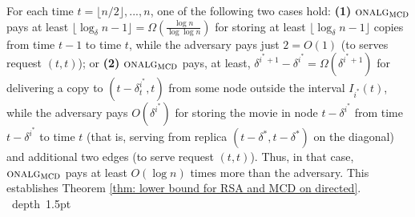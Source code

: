 \documentclass[11pt]{article}
\def\blackslug{\hbox{\hskip 1pt \vrule width 4pt height 8pt
    depth 1.5pt \hskip 1pt}}
\def\QED{\quad\blackslug\lower 8.5pt\null\par}
\newcommand{\onalgrsa}[0]{\mbox{\sc onalg}_{\mbox{\sc\small mcd}}}
\begin{document}
For each time $t= \lfloor n/2\rfloor,...,n$,
one of the following two cases hold:
{\bf (1)}
$\onalgrsa$ pays at least $\lfloor\log_\delta n-1\rfloor=\Omega(\frac{\log n}{\log \log n})$ for storing at least $\lfloor\log_\delta n-1\rfloor$ copies from time $t-1$ to time $t$,
while the adversary pays just $2=O(1)$ (to serves request $(t,t)$); or
{\bf (2)} $\onalgrsa$ pays, at least, $\delta^{i^*+1}-\delta^{i^*}=\Omega(\delta^{i^*+1})$ for delivering a copy  to $(t-\delta^{i^*}_t,t)$ from some node outside the interval $I_{i^*}(t)$,
while the adversary pays $O(\delta^{i^*})$ for storing the movie in node $t-\delta^{i^*}$ from time $t-\delta^{i^*}$ to time $t$
(that is, serving from replica $(t-\delta^*,t-\delta^*)$ on the diagonal) and additional two edges (to serve request $(t,t)$).
Thus, in that case, $\onalgrsa$ pays at least $O(\log n)$ times more than the adversary.
This establishes Theorem \ref{thm: lower bound for RSA and MCD on directed}.
\QED
\end{document}
